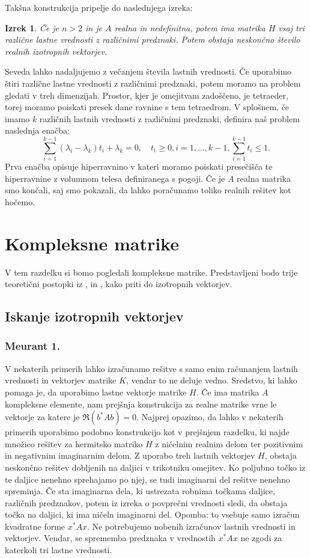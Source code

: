 \documentclass[12pt,a4paper]{amsart}
\theoremstyle{definition}
\theoremstyle{plain}
\newtheorem{izrek}[definicija]{Izrek}
\begin{document}
Takšna konstrukcija pripelje do naslednjega izreka:
\begin{izrek}
Če je $n>2$ in je $A$ realna in nedefinitna, potem ima matrika $H$ vsaj tri različne lastne vrednosti z različnimi predznaki. Potem obstaja neskončno število realnih izotropnih vektorjev.
\end{izrek}
Seveda lahko nadaljujemo z večanjem števila lastnih vrednosti. Če uporabimo štiri različne lastne vrednosti z različnimi predznaki, potem moramo na problem gledati v treh dimenzijah. Prostor, kjer je omejitvam zadoščeno, je tetraeder, torej moramo poiskati presek dane ravnine s tem tetraedrom. 
V splošnem, če imamo $k$ različnih lastnih vrednosti z različnimi predznaki, definira naš problem naslednja enačba:
\begin{equation}
\sum_{i=1}^{k-1} (\lambda_i -\lambda_k)t_i +\lambda_k =0, \quad t_i\ge0, i=1, \dots,k-1, \sum_{i=1}^{k-1}t_i \le1.
\end{equation}
Prva enačba opisuje hiperravnino v kateri moramo poiskati  presečišča te hiperravnine z volumnom telesa definiranega s pogoji.
Če je $A$ realna matrika smo končali, saj smo pokazali, da lahko poračunamo toliko realnih rešitev kot hočemo. 

\section{Kompleksne matrike}
V tem razdelku si bomo pogledali kompleksne matrike. Predstavljeni bodo trije teoretični postopki iz \cite{meurant},\cite{carden} in \cite{trije}, kako priti do izotropnih vektorjev.
\subsection{Iskanje izotropnih vektorjev}
\subsubsection{Meurant 1.}
V nekaterih primerih lahko izračunamo rešitve s samo enim ra\-ču\-na\-njem lastnih vrednosti in vektorjev matrike $K$, vendar to ne deluje vedno. Sredstvo, ki lahko pomaga je, da uporabimo lastne vektorje matrike $H$. Če ima matrika $A$ kompleksne elemente, nam prejšnja konstrukcija za realne matrike vrne le vektorje za katere je $\Re(b^\ast Ab)=0$. Najprej opazimo, da lahko v nekaterih primerih uporabimo podobno konstrukcijo kot v prejšnjem razdelku, ki najde množico rešitev za hermitsko matriko $H$ z ničelnim realnim delom ter pozitivnim in negativnim imaginarnim delom. Z uporabo treh lastnih vektorjev $H$, obstaja neskončno rešitev dobljenih na daljici v trikotniku omejitev. Ko poljubno točko iz te daljice nenehno sprehajamo po njej, se tudi imaginarni del rešitve nenehno spreminja. Če sta imaginarna dela, ki ustrezata robnima točkama daljice, različnih predznakov, potem iz izreka o povprečni vrednosti sledi, da obstaja točka na daljici, ki ima ničeln imaginarni del. %
Opomba: to vsebuje samo izračun kvadratne forme $x^\ast Ax$. Ne potrebujemo nobenih izračunov lastnih vrednosti in vektorjev. Vendar, se sprememba predznaka v vrednostih $x^\ast Ax$ ne zgodi za katerkoli tri lastne vrednosti.
\end{document}
